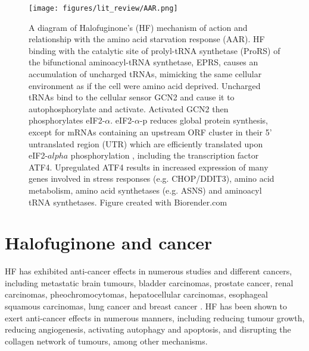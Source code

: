 \begin{figure}[htb]
\centering
\texttt{[image: figures/lit\_review/AAR.png]}
\caption[Halofuginone and the amino acid response diagram]{A diagram of Halofuginone's (HF) mechanism of action and relationship with the amino acid starvation response (AAR).
HF binding with the catalytic site of prolyl-tRNA synthetase (ProRS) of the bifunctional aminoacyl-tRNA synthetase, EPRS, causes an accumulation of uncharged tRNAs, mimicking the same cellular environment as if the cell were amino acid deprived.
Uncharged tRNAs bind to the cellular sensor GCN2 and cause it to autophosphorylate and activate.
Activated GCN2 then phosphorylates eIF2-$\alpha$.
eIF2-$\alpha$-p reduces global protein synthesis, except for mRNAs containing an upstream ORF cluster in their 5' untranslated region (UTR) which are efficiently translated upon eIF2-$alpha$ phosphorylation \cite{ye2015gcn2}, including the transcription factor ATF4.
Upregulated ATF4 results in increased expression of many genes involved in stress responses (e.g. CHOP/DDIT3), amino acid metabolism, amino acid synthetases (e.g. ASNS) and aminoacyl tRNA synthetases.
Figure created with Biorender.com
}
\label{fig:HF_AAR}\end{figure}


\section{Halofuginone and cancer}\label{sec:HF_cancer}

HF has exhibited anti-cancer effects in numerous studies and different cancers, including metastatic brain tumours, bladder carcinomas, prostate cancer, renal carcinomas, pheochromocytomas, hepatocellular carcinomas, esophageal squamous carcinomas, lung cancer and breast cancer \cite{abramovitch2004halofuginone, elkin1999inhibition, gavish2002growth, genin2008myofibroblasts, gross2003treatment, nagler2004suppression, wang2020significance, demiroglu2020anticarcinogenic, xia2018halofuginone}.
HF has been shown to exert anti-cancer effects in numerous manners, including reducing tumour growth, reducing angiogenesis, activating autophagy and apoptosis, and disrupting the collagen network of tumours, among other mechanisms.

